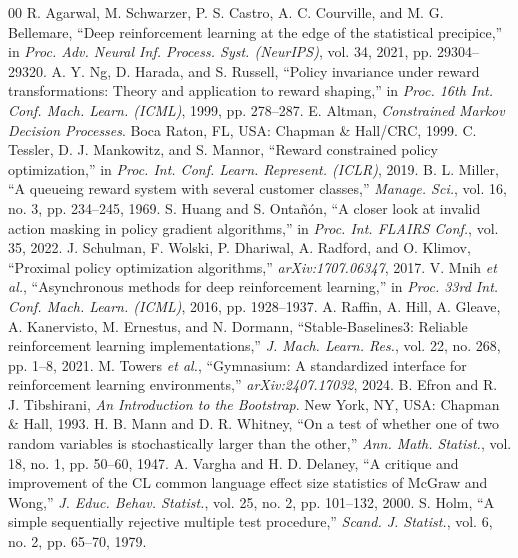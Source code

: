 \documentclass[journal]{IEEEtran}
\begin{document}
\begin{thebibliography}{00}
 R. Agarwal, M. Schwarzer, P. S. Castro, A. C. Courville, and M. G. Bellemare, ``Deep reinforcement learning at the edge of the statistical precipice,'' in \emph{Proc. Adv. Neural Inf. Process. Syst. (NeurIPS)}, vol. 34, 2021, pp. 29304--29320.
 A. Y. Ng, D. Harada, and S. Russell, ``Policy invariance under reward transformations: Theory and application to reward shaping,'' in \emph{Proc. 16th Int. Conf. Mach. Learn. (ICML)}, 1999, pp. 278--287.
 E. Altman, \emph{Constrained Markov Decision Processes}. Boca Raton, FL, USA: Chapman \& Hall/CRC, 1999.
 C. Tessler, D. J. Mankowitz, and S. Mannor, ``Reward constrained policy optimization,'' in \emph{Proc. Int. Conf. Learn. Represent. (ICLR)}, 2019.
 B. L. Miller, ``A queueing reward system with several customer classes,'' \emph{Manage. Sci.}, vol. 16, no. 3, pp. 234--245, 1969.
 S. Huang and S. Onta\~n\'on, ``A closer look at invalid action masking in policy gradient algorithms,'' in \emph{Proc. Int. FLAIRS Conf.}, vol. 35, 2022.
 J. Schulman, F. Wolski, P. Dhariwal, A. Radford, and O. Klimov, ``Proximal policy optimization algorithms,'' \emph{arXiv:1707.06347}, 2017.
 V. Mnih \emph{et al.}, ``Asynchronous methods for deep reinforcement learning,'' in \emph{Proc. 33rd Int. Conf. Mach. Learn. (ICML)}, 2016, pp. 1928--1937.
 A. Raffin, A. Hill, A. Gleave, A. Kanervisto, M. Ernestus, and N. Dormann, ``Stable-Baselines3: Reliable reinforcement learning implementations,'' \emph{J. Mach. Learn. Res.}, vol. 22, no. 268, pp. 1--8, 2021.
 M. Towers \emph{et al.}, ``Gymnasium: A standardized interface for reinforcement learning environments,'' \emph{arXiv:2407.17032}, 2024.
 B. Efron and R. J. Tibshirani, \emph{An Introduction to the Bootstrap}. New York, NY, USA: Chapman \& Hall, 1993.
 H. B. Mann and D. R. Whitney, ``On a test of whether one of two random variables is stochastically larger than the other,'' \emph{Ann. Math. Statist.}, vol. 18, no. 1, pp. 50--60, 1947.
 A. Vargha and H. D. Delaney, ``A critique and improvement of the CL common language effect size statistics of McGraw and Wong,'' \emph{J. Educ. Behav. Statist.}, vol. 25, no. 2, pp. 101--132, 2000.
 S. Holm, ``A simple sequentially rejective multiple test procedure,'' \emph{Scand. J. Statist.}, vol. 6, no. 2, pp. 65--70, 1979.
\end{thebibliography}
\end{document}
